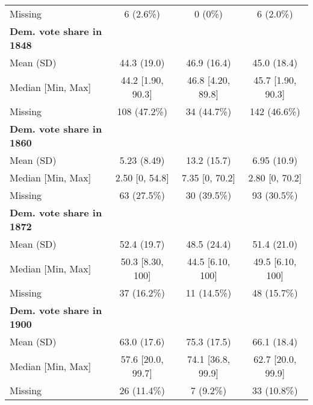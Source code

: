 \begin{table}[h]
\begin{tabular}[t]{>{}lccc}
Missing & 6 (2.6\%) & 0 (0\%) & 6 (2.0\%)\\
\addlinespace
\textbf{Dem. vote share in 1848} &  &  & \\
Mean (SD) & 44.3 (19.0) & 46.9 (16.4) & 45.0 (18.4)\\
Median [Min, Max] & 44.2 [1.90, 90.3] & 46.8 [4.20, 89.8] & 45.7 [1.90, 90.3]\\
Missing & 108 (47.2\%) & 34 (44.7\%) & 142 (46.6\%)\\
\addlinespace
\textbf{Dem. vote share in 1860} &  &  & \\
Mean (SD) & 5.23 (8.49) & 13.2 (15.7) & 6.95 (10.9)\\
Median [Min, Max] & 2.50 [0, 54.8] & 7.35 [0, 70.2] & 2.80 [0, 70.2]\\
Missing & 63 (27.5\%) & 30 (39.5\%) & 93 (30.5\%)\\
\addlinespace
\textbf{Dem. vote share in 1872} &  &  & \\
Mean (SD) & 52.4 (19.7) & 48.5 (24.4) & 51.4 (21.0)\\
Median [Min, Max] & 50.3 [8.30, 100] & 44.5 [6.10, 100] & 49.5 [6.10, 100]\\
Missing & 37 (16.2\%) & 11 (14.5\%) & 48 (15.7\%)\\
\addlinespace
\textbf{Dem. vote share in 1900} &  &  & \\
Mean (SD) & 63.0 (17.6) & 75.3 (17.5) & 66.1 (18.4)\\
Median [Min, Max] & 57.6 [20.0, 99.7] & 74.1 [36.8, 99.9] & 62.7 [20.0, 99.9]\\
Missing & 26 (11.4\%) & 7 (9.2\%) & 33 (10.8\%)\\
\bottomrule
\end{tabular}
\end{table}
